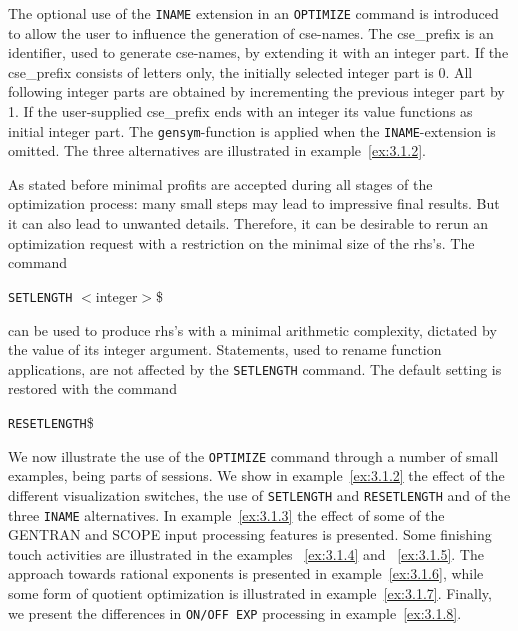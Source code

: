 The optional use of the {\tt INAME} extension in an {\tt OPTIMIZE} command
is introduced to allow the user to influence the generation of cse-names.
The cse\_prefix is an identifier, used to generate cse-names, by
extending it with an integer part. If the cse\_prefix consists of letters
only, the initially selected integer part is 0. All following integer parts are
obtained by incrementing the previous integer part by 1. If the user-supplied
cse\_prefix ends with an integer its value functions as initial integer part.
The {\tt gensym}-function is applied when the {\tt INAME}-extension is omitted.
The three alternatives are illustrated in example~\ref{ex:3.1.2}.

As stated before minimal profits are accepted during all stages of the
optimization process: many small steps may lead to impressive final results.
But it can also lead to unwanted details. Therefore, it can be desirable
to rerun an optimization request with a restriction on the minimal size of 
the rhs's. The command 

\hspace*{1cm} {\tt SETLENGTH} $<$integer$>$\$  

can be used to produce rhs's with a minimal arithmetic complexity, 
dictated by the value of 
its integer argument. Statements, used to rename function applications, are 
not affected by the {\tt SETLENGTH} command. The default setting is restored 
with the command 

\hspace*{1cm} {\tt RESETLENGTH}\$

We now illustrate the use of the {\tt OPTIMIZE} command through a number of
small examples, being parts of {\REDUCE} sessions. We show in
example~\ref{ex:3.1.2} the effect of the different visualization switches,
the use of {\tt SETLENGTH} and {\tt RESETLENGTH} and of the three {\tt INAME}
alternatives. In example~\ref{ex:3.1.3} the effect of some of the GENTRAN and 
SCOPE input processing features is presented. Some finishing touch activities 
are illustrated in the examples  ~\ref{ex:3.1.4} and ~\ref{ex:3.1.5}. 
The approach towards rational exponents is presented in 
example~\ref{ex:3.1.6}, while some form of quotient optimization is 
illustrated in example~\ref{ex:3.1.7}. Finally, we present the differences 
in {\tt ON/OFF EXP} processing in example~\ref{ex:3.1.8}.

\example\label{ex:3.1.2}

